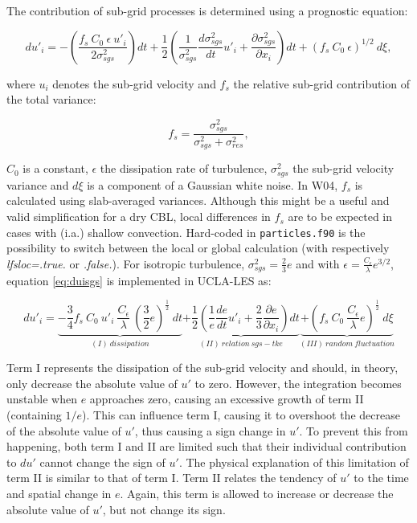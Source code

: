 \documentclass[twoside,a4paper]{report}
\begin{document}
The contribution of sub-grid processes is determined using a prognostic equation:

\begin{equation}
  du'_i = - \left(\frac{f_s \: C_0 \: \epsilon \: u'_i}{2 \sigma^2_{sgs}}\right)dt 
          + \frac{1}{2} \left( \frac{1}{\sigma^2_{sgs}} \frac{d\sigma^2_{sgs}}{dt} u'_i + \frac{\partial \sigma^2_{sgs}}{\partial x_i}\right) dt
          + (f_s \: C_0 \: \epsilon)^{1/2} \: d\xi,
\label{eq:duisgs}
\end{equation}

where $u_i$ denotes the sub-grid velocity and $f_s$ the relative sub-grid contribution of the total variance:

\begin{equation}
  f_s = \frac{\sigma^2_{sgs}}{\sigma^2_{sgs} + \sigma^2_{res}},
\label{eq:fs}
\end{equation}

$C_0$ is a constant, $\epsilon$ the dissipation rate of turbulence, $\sigma^2_{sgs}$ the sub-grid velocity variance and $d\xi$ is a component of a Gaussian white noise. 
In W04, $f_s$ is calculated using slab-averaged variances. Although this might be a useful and valid simplification for a dry CBL, local differences in $f_s$ are to be expected in cases with (i.a.) shallow convection. Hard-coded in \texttt{particles.f90} is the possibility to switch between the local or global calculation (with respectively \textit{lfsloc=.true.} or \textit{.false.}). For isotropic turbulence, $\sigma^2_{sgs} = \frac{2}{3}e$ and with $\epsilon = \frac{C_\epsilon}{\lambda}e^{3/2}$, equation \ref{eq:duisgs} is implemented in UCLA-LES as:

\begin{equation}
  du'_i = \underbrace{-\frac{3}{4} f_s \: C_0 \: u'_i \: \frac{C_\epsilon}{\lambda} \: \left(\frac{3}{2}e\right)^\frac{1}{2} \: dt}_{(I) \: dissipation}
          \underbrace{+\frac{1}{2} \left( \frac{1}{e} \frac{de}{dt} u'_i + \frac{2}{3}\frac{\partial e}{\partial x_i}\right) dt}_{(II) \: relation \: sgs-tke}
          \underbrace{+\left(f_s \: C_0 \: \frac{C_\epsilon}{\lambda}e\right)^\frac{1}{2} \: d\xi}_{(III) \: random \: fluctuation}
\label{eq:duisgs_uclales}
\end{equation}

Term I represents the dissipation of the sub-grid velocity and should, in theory, only decrease the absolute value of $u'$ to zero. However, the integration becomes unstable when $e$ approaches zero, causing an excessive growth of term II (containing $1/e$). This can influence term I, causing it to overshoot the decrease of the absolute value of $u'$, thus causing a sign change in $u'$. To prevent this from happening, both term I and II are limited such that their individual contribution to $du'$ cannot change the sign of $u'$. The physical explanation of this limitation of term II is similar to that of term I. Term II relates the tendency of $u'$ to the time and spatial change in $e$. Again, this term is allowed to increase or decrease the absolute value of $u'$, but not change its sign. \newline
\end{document}
